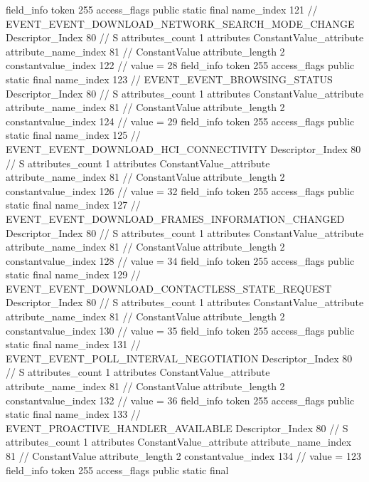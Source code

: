 {{{{{{{				}
				}
			}
			field_info {
				token	255
				access_flags	public static final
				name_index	121		// EVENT_EVENT_DOWNLOAD_NETWORK_SEARCH_MODE_CHANGE
				Descriptor_Index	80		// S
				attributes_count	1
				attributes {
				ConstantValue_attribute {
					attribute_name_index	81		// ConstantValue
					attribute_length	2
					constantvalue_index	122		// value = 28
				}
				}
			}
			field_info {
				token	255
				access_flags	public static final
				name_index	123		// EVENT_EVENT_BROWSING_STATUS
				Descriptor_Index	80		// S
				attributes_count	1
				attributes {
				ConstantValue_attribute {
					attribute_name_index	81		// ConstantValue
					attribute_length	2
					constantvalue_index	124		// value = 29
				}
				}
			}
			field_info {
				token	255
				access_flags	public static final
				name_index	125		// EVENT_EVENT_DOWNLOAD_HCI_CONNECTIVITY
				Descriptor_Index	80		// S
				attributes_count	1
				attributes {
				ConstantValue_attribute {
					attribute_name_index	81		// ConstantValue
					attribute_length	2
					constantvalue_index	126		// value = 32
				}
				}
			}
			field_info {
				token	255
				access_flags	public static final
				name_index	127		// EVENT_EVENT_DOWNLOAD_FRAMES_INFORMATION_CHANGED
				Descriptor_Index	80		// S
				attributes_count	1
				attributes {
				ConstantValue_attribute {
					attribute_name_index	81		// ConstantValue
					attribute_length	2
					constantvalue_index	128		// value = 34
				}
				}
			}
			field_info {
				token	255
				access_flags	public static final
				name_index	129		// EVENT_EVENT_DOWNLOAD_CONTACTLESS_STATE_REQUEST
				Descriptor_Index	80		// S
				attributes_count	1
				attributes {
				ConstantValue_attribute {
					attribute_name_index	81		// ConstantValue
					attribute_length	2
					constantvalue_index	130		// value = 35
				}
				}
			}
			field_info {
				token	255
				access_flags	public static final
				name_index	131		// EVENT_EVENT_POLL_INTERVAL_NEGOTIATION
				Descriptor_Index	80		// S
				attributes_count	1
				attributes {
				ConstantValue_attribute {
					attribute_name_index	81		// ConstantValue
					attribute_length	2
					constantvalue_index	132		// value = 36
				}
				}
			}
			field_info {
				token	255
				access_flags	public static final
				name_index	133		// EVENT_PROACTIVE_HANDLER_AVAILABLE
				Descriptor_Index	80		// S
				attributes_count	1
				attributes {
				ConstantValue_attribute {
					attribute_name_index	81		// ConstantValue
					attribute_length	2
					constantvalue_index	134		// value = 123
				}
				}
			}
			field_info {
				token	255
				access_flags	public static final
}}}}}
